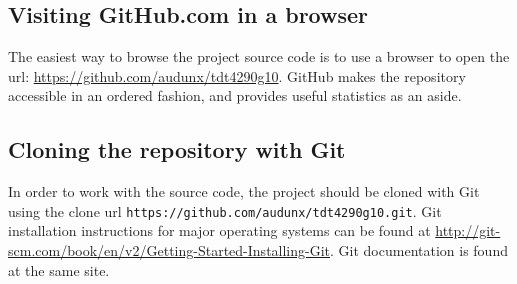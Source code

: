 \documentclass[../document.tex]{subfiles}
\begin{document}
\subsection{Visiting GitHub.com in a browser}
The easiest way to browse the project source code is to use a browser to open the url: \url{https://github.com/audunx/tdt4290g10}. GitHub makes the repository accessible in an ordered fashion, and provides useful statistics as an aside.

\subsection{Cloning the repository with Git}
In order to work with the source code, the project should be cloned with Git using the clone url \texttt{https://github.com/audunx/tdt4290g10.git}. Git installation instructions for major operating systems can be found at \url{http://git-scm.com/book/en/v2/Getting-Started-Installing-Git}. Git documentation is found at the same site.
\end{document}
